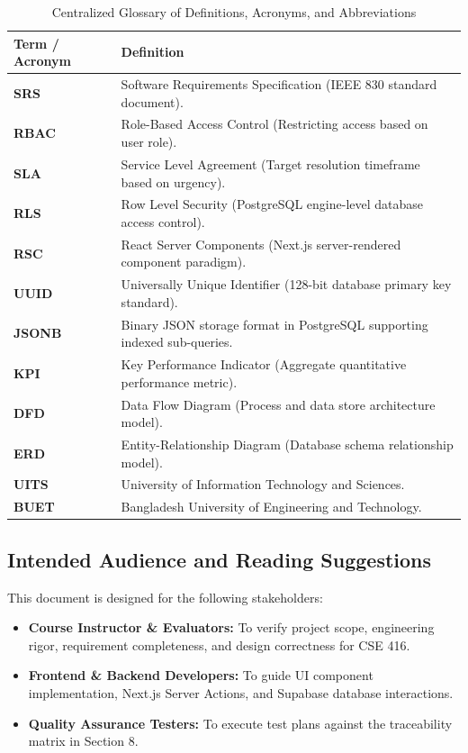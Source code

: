 \documentclass[12pt, a4paper]{article}
\begin{document}
\begin{table}[H]
    \centering
    \caption{Centralized Glossary of Definitions, Acronyms, and Abbreviations}
    \label{tab:acronyms}
    \begin{tabularx}{\textwidth}{l X}
        \toprule
        \textbf{Term / Acronym} & \textbf{Definition} \\
        \midrule
        \textbf{SRS} & Software Requirements Specification (IEEE 830 standard document). \\
        \textbf{RBAC} & Role-Based Access Control (Restricting access based on user role). \\
        \textbf{SLA} & Service Level Agreement (Target resolution timeframe based on urgency). \\
        \textbf{RLS} & Row Level Security (PostgreSQL engine-level database access control). \\
        \textbf{RSC} & React Server Components (Next.js server-rendered component paradigm). \\
        \textbf{UUID} & Universally Unique Identifier (128-bit database primary key standard). \\
        \textbf{JSONB} & Binary JSON storage format in PostgreSQL supporting indexed sub-queries. \\
        \textbf{KPI} & Key Performance Indicator (Aggregate quantitative performance metric). \\
        \textbf{DFD} & Data Flow Diagram (Process and data store architecture model). \\
        \textbf{ERD} & Entity-Relationship Diagram (Database schema relationship model). \\
        \textbf{UITS} & University of Information Technology and Sciences. \\
        \textbf{BUET} & Bangladesh University of Engineering and Technology. \\
        \bottomrule
    \end{tabularx}
\end{table}

\subsection{Intended Audience and Reading Suggestions}
This document is designed for the following stakeholders:
\begin{itemize}[leftmargin=*]
    \item \textbf{Course Instructor \& Evaluators:} To verify project scope, engineering rigor, requirement completeness, and design correctness for CSE 416.
    \item \textbf{Frontend \& Backend Developers:} To guide UI component implementation, Next.js Server Actions, and Supabase database interactions.
    \item \textbf{Quality Assurance Testers:} To execute test plans against the traceability matrix in Section 8.
\end{itemize}
\end{document}
